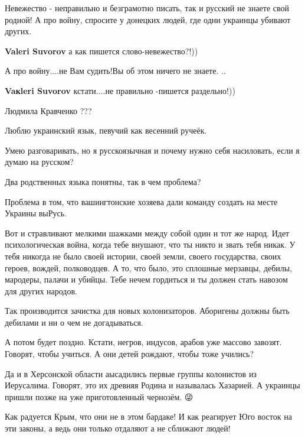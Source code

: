 \begin{itemize}
{\begin{itemize}
Невежество - неправильно и безграмотно писать, так и русский не знаете свой
родной! А про войну, спросите у донецких людей, где одни украинцы убивают
других.

\textbf{Valeri Suvorov} а как пишется слово-невежество?!))

А про войну....не Вам судить!Вы об этом ничего не знаете. ..

\textbf{Vaкleri Suvorov} кстати....не правильно -пишется раздельно!))

Людмила Кравченко ???
\end{itemize}


Люблю украинский язык, певучий как весенний ручеёк.

Умею разговаривать, но я русскоязычная и почему нужно себя насиловать, если я
думаю на русском?

Два родственных языка понятны, так в чем проблема?


Проблема в том, что вашингтонские хозяева дали команду создать на месте Украины выРусь.

Вот и стравливают мелкими шажками между собой один и тот же народ. Идет
психологическая война, когда тебе внушают, что ты никто и звать тебя никак. У
тебя никогда не было своей истории, своей земли, своего государства, своих
героев, вождей, полководцев. А то, что было, это сплошные мерзавцы, дебилы,
мародеры, палачи и убийцы. Тебе нечем гордиться и ты должен стать навозом для
других народов.

Так производится зачистка для новых колонизаторов. Аборигены должны быть
дебилами и ни о чем не догадываться.

А потом будет поздно. Кстати, негров, индусов, арабов уже массово завозят.
Говорят, чтобы учиться. А они детей рождают, чтобы тоже учились?

Да и в Херсонской области аысадились первые группы колонистов из Иерусалима.
Говорят, это их древняя Родина и называлась Хазарией. А украинцы пришли позже
на уже приготовленный чернозём. 😜


Как радуется Крым, что они не в этом бардаке! И как реагирует Юго восток на эти
законы, а ведь они только отдаляют а не сближают людей!

}
\end{itemize}
